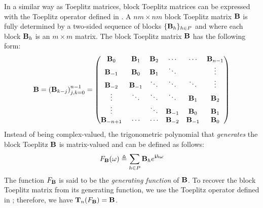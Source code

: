 In a similar way as Toeplitz matrices, block Toeplitz matrices can be expressed with the Toeplitz operator defined in .
A $nm\times nm$ block Toeplitz matrix $\mathbf{B}$ is fully determined by a two-sided sequence of blocks $\{\mathbf{B}_h\}_{h \in P}$ and where each block $\mathbf{B}_h$ is an $m \times m$ matrix.  
The block Toeplitz matrix $\mathbf{B}$ has the following form:
\begin{equation}
  \Bmat = \leftmat \Bmat_{k-j} \rightmat_{j,k = 0}^{n-1} = 
  \leftmatrix
    \Bmat_{0}    & \Bmat_{1}  & \Bmat_{2} & \cdots     & \cdots     & \Bmat_{n-1} \\
    \Bmat_{-1}   & \Bmat_{0}  & \Bmat_{1} & \ddots     &            & \vdots      \\
    \Bmat_{-2}   & \Bmat_{-1} & \ddots    & \ddots     & \ddots     & \vdots      \\ 
    \vdots       & \ddots     & \ddots    & \ddots     & \Bmat_{1}  & \Bmat_{2}   \\
    \vdots       &            & \ddots    & \Bmat_{-1} & \Bmat_{0}  & \Bmat_{1}   \\
    \Bmat_{-n+1} & \cdots     & \cdots    & \Bmat_{-2} & \Bmat_{-1} & \Bmat_0
  \rightmatrix
\end{equation}
\noindent
Instead of being complex-valued, the trigonometric polynomial that \emph{generates} the block Toeplitz $\mathbf{B}$ is matrix-valued and can be defined as follows:
\begin{equation}
  F_{\mathbf{B}}(\omega) \triangleq \sum_{h \in P} \mathbf{B}_h e^{\mathbf{i} h \omega}
\end{equation}
The function $F_{\mathbf{B}}$ is said to be the \emph{generating function} of $\mathbf{B}$.
To recover the block Toeplitz matrix from its generating function, we use the Toeplitz operator defined in ; therefore, we have $\mathbf{T}_n(F_\mathbf{B}) = \mathbf{B}$.

